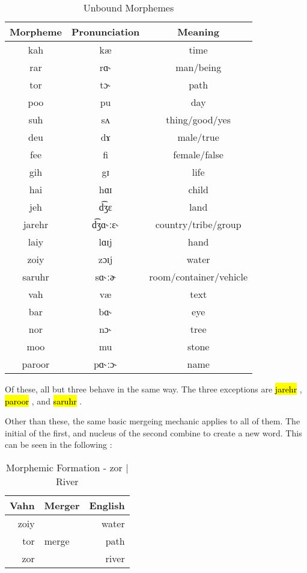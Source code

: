 \documentclass{article}
\newcommand{\hlv}[2][gray]{ {\sethlcolor{#1} \hl{#2}} }
\begin{document}
\begin{table}[H]
    \centering
    \begin{tabular}{c|c|c}
        Morpheme & Pronunciation & Meaning \\
        \hline
        kah & kæ & time \\
        rar & rɑ˞ & man/being \\
        tor & tɔ˞ & path \\
        poo & pu & day \\
        suh & sʌ & thing/good/yes\\
        deu & dɤ & male/true \\
        fee & fi & female/false \\
        gih & gɪ & life \\
        hai & hɑɪ & child \\
        jeh & d͡ʒɛ & land \\
        jarehr & d͡ʒɑ˞ːɛ˞ & country/tribe/group \\
        laiy & lɑɪj & hand \\
        zoiy & zɔɪj & water \\
        saruhr & sɑ˞ːɚ & room/container/vehicle \\
        vah & væ & text \\
        bar & bɑ˞ & eye \\
        nor & nɔ˞ & tree \\
        moo & mu & stone \\
        paroor & pɑ˞ːɔ˞ & name \\
    \end{tabular}
    \caption{Unbound Morphemes}
    \label{Unbound Morphemes}
\end{table}

Of these, all but three behave in the same way. The three exceptions are \hlv{jarehr}, \hlv{paroor},
and \hlv{saruhr}.

Other than these, the same basic mergeing mechanic applies to all of them. The initial of the first,
and nucleus of the second combine to create a new word. This can be seen in the following :

\begin{table}[H]
    \centering
    \begin{tabular}{r|l||r}
        Vahn     & Merger & English  \\
        \hline\hline
        zoiy &       & water      \\
        tor & merge  & path    \\
        \hline \hline
        zor &        & river
    \end{tabular}
    \caption{Morphemic Formation - zor | River}
    \label{Morphemic Formation - zor | River}
\end{table}
\end{document}
